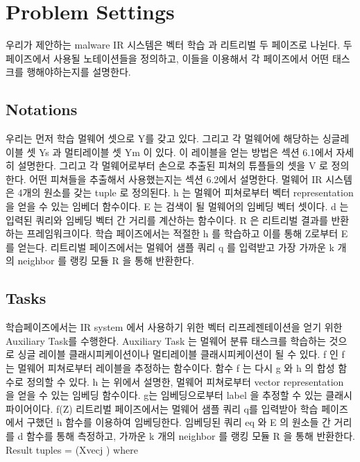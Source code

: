 \section{Problem Settings}

우리가 제안하는 malware IR 시스템은 벡터 학습 과 리트리벌 두 페이즈로 나뉜다. 두 페이즈에서 사용될 노테이션들을 정의하고, 이들을 이용해서 각 페이즈에서 어떤 태스크를 행해야하는지를 설명한다. 

\subsection{Notations}

우리는 먼저 학습 멀웨어 셋으로 Y를 갖고 있다. 그리고 각 멀웨어에 해당하는 싱글레이블 셋  Ys 과 멀티레이블 셋 Ym 이 있다. 이 레이블을 얻는 방법은 섹션 6.1에서 자세히 설명한다. 그리고 각 멀웨어로부터 손으로 추출된 피쳐의 튜플들의 셋을 V 로 정의한다. 어떤 피쳐들을 추출해서 사용했는지는 섹션 6.2에서 설명한다. 
멀웨어 IR 시스템은  4개의 원소를 갖는 tuple 로 정의된다. h 는 멀웨어 피쳐로부터 벡터 representation 을 얻을 수 있는 임베더 함수이다. E 는 검색이 될 멀웨어의 임베딩 벡터 셋이다. d 는 입력된 쿼리와 임베딩 벡터 간 거리를 계산하는 함수이다. R 은 리트리벌 결과를 반환하는 프레임워크이다. 학습 페이즈에서는 적절한 h 를 학습하고 이를 통해 Z로부터 E를 얻는다. 리트리벌 페이즈에서는 멀웨어 샘플 쿼리 q 를 입력받고 가장 가까운 k 개의 neighbor 를 랭킹 모듈 R 을 통해 반환한다.


\subsection{Tasks}

학습페이즈에서는 IR system 에서 사용하기 위한 벡터 리프레젠테이션을 얻기 위한 Auxiliary Task를 수행한다. Auxiliary Task 는 멀웨어 분류 태스크를 학습하는 것으로 싱글 레이블 클래시피케이션이나 멀티레이블 클래시피케이션이 될 수 있다. f 인 f 는 멀웨어 피쳐로부터 레이블을 추정하는 함수이다. 함수 f 는 다시 g 와 h 의 합성 함수로 정의할 수 있다. h 는 위에서 설명한, 멀웨어 피쳐로부터 vector representation 을 얻을 수 있는 임베딩 함수이다. g는 임베딩으로부터 label 을 추정할 수 있는 클래시파이어이다.  
f(Z)
리트리벌 페이즈에서는 멀웨어 샘플 쿼리 q를 입력받아 학습 페이즈에서 구했던 h 함수를 이용하여 임베딩한다. 임베딩된 쿼리 eq 와 E 의 원소들 간 거리를 d 함수를 통해 측정하고, 가까운 k 개의 neighbor 를 랭킹 모듈 R 을 통해 반환한다. 
Result tuples = (Xvecj ) where


